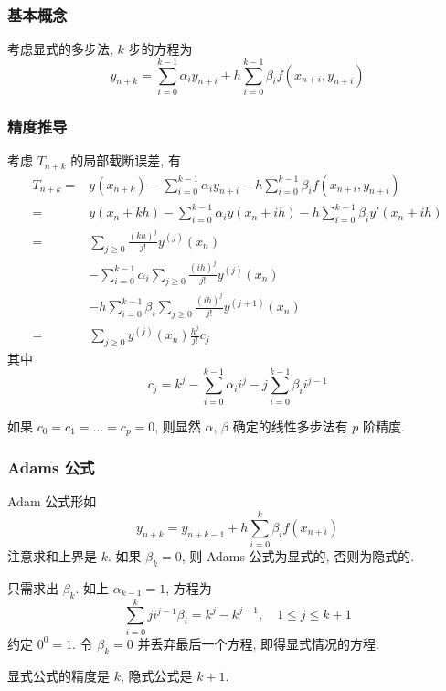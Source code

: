 \documentclass{ctexart}
\begin{document}
\subsubsection{基本概念}
    考虑显式的多步法, $k$ 步的方程为 \[
        y_{n+k} = \sum_{i=0}^{k-1} \alpha_i y_{n+i} + h \sum_{i=0}^{k-1} \beta_i f(x_{n+i}, y_{n+i})\]
\subsubsection{精度推导}
    考虑 $T_{n+k}$ 的局部截断误差, 有 \begin{align*}
        T_{n+k} =& y(x_{n+k}) - \sum_{i=0}^{k-1} \alpha_i y_{n+i} - h \sum_{i=0}^{k-1} \beta_i f(x_{n+i}, y_{n+i})\\
                =& y(x_n + kh) - \sum_{i=0}^{k-1} \alpha_i y(x_n + ih) - h \sum_{i=0}^{k-1} \beta_i y'(x_n + ih)\\
                =& \sum_{j\ge 0} \frac{(kh)^j}{j!} y^{(j)}(x_n) \\
                &- \sum_{i=0}^{k-1} \alpha_i \sum_{j\ge 0} \frac{(ih)^j}{j!} y^{(j)}(x_n) \\
                &- h \sum_{i=0}^{k-1} \beta_i \sum_{j\ge 0} \frac{(ih)^j}{j!} y^{(j+1)}(x_n)\\
                =& \sum_{j\ge 0} y^{(j)}(x_n) \frac{h^j}{j!} c_j
    \end{align*}
    其中 \[
        c_j =  k^j - \sum_{i=0}^{k-1} \alpha_i i^j - j\sum_{i=0}^{k-1} \beta_i i^{j-1}\]
    \par
    如果 $c_0 = c_1 = \ldots = c_p = 0$, 则显然 $\alpha$, $\beta$ 确定的线性多步法有 $p$ 阶精度.
\subsubsection{Adams 公式}
    Adam 公式形如 \[
        y_{n+k} = y_{n+k-1} + h\sum_{i=0}^{k} \beta_i f(x_{n+i})\]
    注意求和上界是 $k$. 如果 $\beta_k =0$, 则 Adams 公式为显式的,
    否则为隐式的.\par
    只需求出 $\beta_k$. 如上 $\alpha_{k-1} = 1$, 方程为 \[
        \sum_{i=0}^{k} j i^{j-1} \beta_i = k^j - k^{j-1},\quad 1 \le j \le k+1\]
    约定 $0^0 = 1$. 令 $\beta_{k} =0$ 并丢弃最后一个方程, 即得显式情况的方程.\par
    显式公式的精度是 $k$, 隐式公式是 $k+1$.
\end{document}
